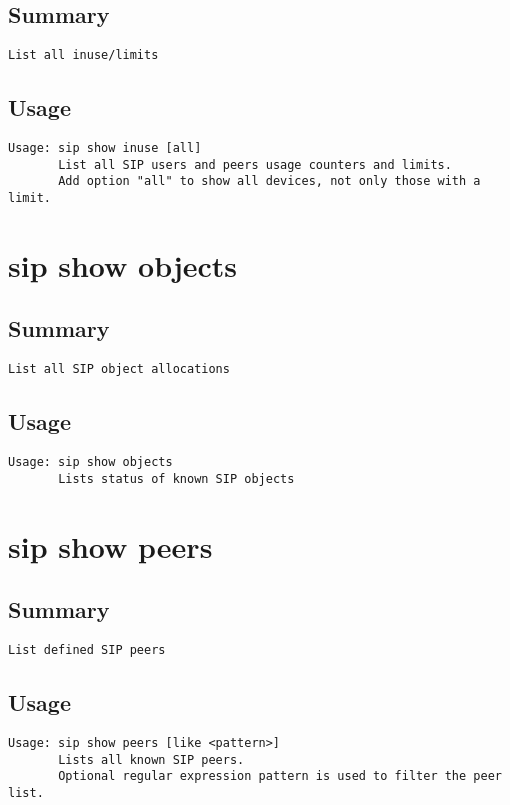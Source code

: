 \subsection{Summary}
\begin{verbatim}
List all inuse/limits
\end{verbatim}
\subsection{Usage}
\begin{verbatim}
Usage: sip show inuse [all]
       List all SIP users and peers usage counters and limits.
       Add option "all" to show all devices, not only those with a limit.

\end{verbatim}


\section{sip show objects}
\subsection{Summary}
\begin{verbatim}
List all SIP object allocations
\end{verbatim}
\subsection{Usage}
\begin{verbatim}
Usage: sip show objects
       Lists status of known SIP objects

\end{verbatim}


\section{sip show peers}
\subsection{Summary}
\begin{verbatim}
List defined SIP peers
\end{verbatim}
\subsection{Usage}
\begin{verbatim}
Usage: sip show peers [like <pattern>]
       Lists all known SIP peers.
       Optional regular expression pattern is used to filter the peer list.

\end{verbatim}


